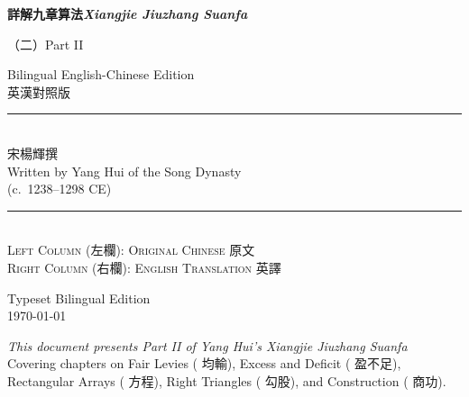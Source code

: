 \documentclass[11pt,a4paper]{article}
\newcommand{\longline}{\noindent\rule{\textwidth}{0.4pt}}
\newcommand{\zh}[1]{{\CJKfamily{\CJKrmdefault} #1}}
\begin{document}
\begin{titlepage}
\begin{center}

\vspace*{1.5cm}

{\Huge\bfseries\color{titlecolor}
\zh{詳解九章算法}\quad\textit{Xiangjie Jiuzhang Suanfa}\\[0.6cm]}

{\LARGE\color{sectioncolor}
\zh{（二）}\quad Part II\\[1.2cm]}

{\Large\color{notecolor}
Bilingual English-Chinese Edition\\[0.3cm]
\zh{英漢對照版}\\[2cm]}

\longline\\[1cm]

{\Large\zh{宋\quad 楊輝\quad 撰}}\\[0.3cm]
{\large Written by Yang Hui of the Song Dynasty}\\[0.3cm]
{\normalsize (c.\ 1238--1298 CE)}\\[1.5cm]

\longline\\[1.2cm]

{\large\color{sectioncolor}
\textsc{Left Column (左欄): Original Chinese \zh{原文}}\\[0.3cm]
\textsc{Right Column (右欄): English Translation \zh{英譯}}\\[1.5cm]}

{\large\color{notecolor}
Typeset Bilingual Edition\\[0.3cm]
\today}

\vfill

{\small
\textit{This document presents Part II of Yang Hui's \textit{Xiangjie Jiuzhang Suanfa}}\\[0.3cm]
Covering chapters on Fair Levies (\zh{均輸}), Excess and Deficit (\zh{盈不足}),\\
Rectangular Arrays (\zh{方程}), Right Triangles (\zh{勾股}), and Construction (\zh{商功}).}

\end{center}
\end{titlepage}

\tableofcontents
\newpage

\end{document}
